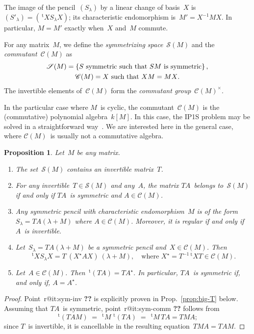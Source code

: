\documentclass{article}%
\makeatletter
\newtheorem{prop}{Proposition}
\def\labelenumi{(\roman{enumi})}
\def\itemref#1{\expandafter\ifx\csname r@#1\endcsname\relax
  {\bfseries ??}\else{\setcounter{enumi}{\ref{#1}}\labelenumi}\fi}
\let\ro\mathscr
\def\transpose{\,{}^{\mathrm{t}\!}}
\def\acco#1{\left\{#1\right\}}
\makeatother
\begin{document}
The image of the pencil~$(S_{λ})$ by a linear change of basis~$X$
is~$(S'_{λ}) = (\transpose{X} S_{λ} X)$; its characteristic endomorphism
is~$M' = X^{-1} M X$. In particular, $M = M'$ exactly when~$X$ and~$M$
commute.


For any matrix~$M$, we define the \emph{symmetrizing space}~$\ro S(M)$
and the \emph{commutant}~$\ro C(M)$ as
\begin{gather}
\ro S(M) = \acco{\text{$S$ symmetric such that $SM$~is symmetric} },\\
\ro C(M) = \text{\text{$X$ such that~$XM = MX$}}.
\end{gather}
The invertible elements of~$\ro C(M)$ form the \emph{commutant
group}~$\ro C(M)^{×}$.

In the particular case where $M$~is cyclic, the commutant~$\ro C(M)$ is
the (commutative) polynomial algebra~$k[M]$. In this case, the IP1S
problem may be solved in a straightforward way~\cite{MPG2013}. We are
interested here in the general case, where $\ro C(M)$~is usually not a
commutative algebra.

\begin{prop}\label{prop:structure-sym}
Let~$M$ be any matrix.
\begin{enumerate}
\item \label{it:sym-inv} The set~$\ro S(M)$ contains an invertible
matrix~$T$.
\item \label{it:sym-comm} For any invertible~$T ∈ \ro S(M)$ and any~$A$,
the matrix $TA$~belongs to~$\ro S(M)$ if and only if $TA$~is symmetric
and $A ∈ \ro C(M)$.
\item Any symmetric pencil with characteristic endomorphism~$M$ is of the
form~$S_{λ} = TA (λ + M)$ where $A ∈ \ro C(M)$. Moreover, it is regular
if and only if $A$~is invertible.
\item Let~$S_{λ} = TA (λ + M)$ be a symmetric pencil and~$X ∈ \ro C(M)$.
Then
\begin{equation*}
\transpose{X} S_{λ} X = T \:(X^{⋆} A X)\: (λ + M), \quad
\text{where $X^{⋆} = T^{-1} \transpose{X} T ∈ \ro C(M)$.}
\end{equation*}
\item Let~$A ∈ \ro C(M)$. Then $\transpose{(TA)} = TA^{⋆}$. In
particular, $TA$~is symmetric if, and only if, $A = A^{⋆}$.
\end{enumerate}
\end{prop}

\begin{proof}
Point~\itemref{it:sym-inv} is explicitly proven in Prop.~\ref{prop:big-T}
below. Assuming that $TA$~is symmetric, point~\itemref{it:sym-comm}
follows from
\begin{equation}
\transpose{(TAM)} \;=\; \transpose{M}\, \transpose{(TA)}
 \;=\; \transpose{M}\,TA = TMA;
\end{equation}
since $T$~is invertible, it is cancellable in the resulting equation~$TMA
= TAM$.
\end{proof}
\end{document}
